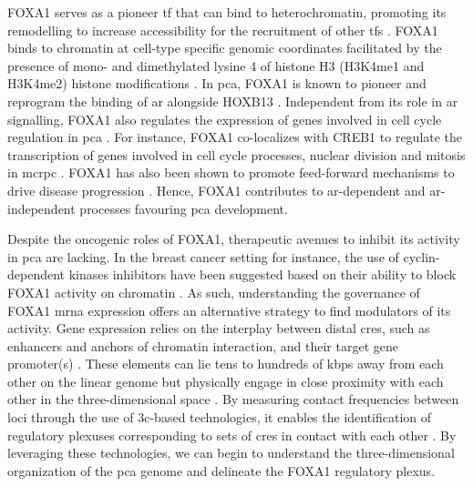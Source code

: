 FOXA1 serves as a pioneer \gls{tf} that can bind to heterochromatin, promoting its remodelling to increase accessibility for the recruitment of other \glspl{tf} \cite{yangCurrentPerspectivesFOXA12015}.
FOXA1 binds to chromatin at cell-type specific genomic coordinates facilitated by the presence of mono- and dimethylated lysine 4 of histone H3 (H3K4me1 and H3K4me2) histone modifications \cite{lupienFoxA1TranslatesEpigenetic2008,eeckhouteCelltypeSelectiveChromatin2008}.
In \gls{pca}, FOXA1 is known to pioneer and reprogram the binding of \gls{ar} alongside HOXB13 \cite{pomerantzAndrogenReceptorCistrome2015}.
Independent from its role in \gls{ar} signalling, FOXA1 also regulates the expression of genes involved in cell cycle regulation in \gls{pca} \cite{imamuraFOXA1PromotesTumor2012,imamuraFOXA1PromotesTumor2012,xuAndrogensInduceProstate2006}.
For instance, FOXA1 co-localizes with CREB1 to regulate the transcription of genes involved in cell cycle processes, nuclear division and mitosis in \gls{mcrpc} \cite{imamuraFOXA1PromotesTumor2012,jinAndrogenReceptorIndependentFunction2013,xuAndrogensInduceProstate2006,yangFOXA1PotentiatesLineagespecific2016,zhangFOXA1DefinesCancer2016,augelloFOXA1MasterSteroid2011,sunkelIntegrativeAnalysisIdentifies2017}.
FOXA1 has also been shown to promote feed-forward mechanisms to drive disease progression \cite{niAmplitudeModulationAndrogen2013,sasseFeedforwardTranscriptionalProgramming2015}.
Hence, FOXA1 contributes to \gls{ar}-dependent and \gls{ar}-independent processes favouring \gls{pca} development.

Despite the oncogenic roles of FOXA1, therapeutic avenues to inhibit its activity in \gls{pca} are lacking.
In the breast cancer setting for instance, the use of cyclin-dependent kinases inhibitors have been suggested based on their ability to block FOXA1 activity on chromatin \cite{wangHighThroughputChemical2018}.
As such, understanding the governance of FOXA1 \gls{mrna} expression offers an alternative strategy to find modulators of its activity.
Gene expression relies on the interplay between distal \glspl{cre}, such as enhancers and anchors of chromatin interaction, and their target gene promoter(s) \cite{rowleyOrganizationalPrinciples3D2018}.
These elements can lie tens to hundreds of \glspl{kbp} away from each other on the linear genome but physically engage in close proximity with each other in the three-dimensional space \cite{vernimmenHierarchyTranscriptionalActivation2015}.
By measuring contact frequencies between loci through the use of \gls{3c}-based technologies, it enables the identification of regulatory plexuses corresponding to sets of \glspl{cre} in contact with each other \cite{sallariConvergenceDispersedRegulatory2016,baileyNoncodingSomaticInherited2016}.
By leveraging these technologies, we can begin to understand the three-dimensional organization of the \gls{pca} genome and delineate the FOXA1 regulatory plexus.

